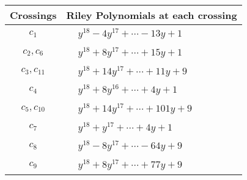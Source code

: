 \documentclass[1p]{elsarticle_modified}
\theoremstyle{definition}
\begin{document}
\begin{tabular}{m{50pt}|m{274pt}}
Crossings & \hspace{64pt}Riley Polynomials at each crossing \\
\hline $$\begin{aligned}c_{1}\end{aligned}$$&$\begin{aligned}
&y^{18}-4 y^{17}+\cdots-13 y+1
\end{aligned}$\\
\hline $$\begin{aligned}c_{2},c_{6}\end{aligned}$$&$\begin{aligned}
&y^{18}+8 y^{17}+\cdots+15 y+1
\end{aligned}$\\
\hline $$\begin{aligned}c_{3},c_{11}\end{aligned}$$&$\begin{aligned}
&y^{18}+14 y^{17}+\cdots+11 y+9
\end{aligned}$\\
\hline $$\begin{aligned}c_{4}\end{aligned}$$&$\begin{aligned}
&y^{18}+8 y^{16}+\cdots+4 y+1
\end{aligned}$\\
\hline $$\begin{aligned}c_{5},c_{10}\end{aligned}$$&$\begin{aligned}
&y^{18}+14 y^{17}+\cdots+101 y+9
\end{aligned}$\\
\hline $$\begin{aligned}c_{7}\end{aligned}$$&$\begin{aligned}
&y^{18}+y^{17}+\cdots+4 y+1
\end{aligned}$\\
\hline $$\begin{aligned}c_{8}\end{aligned}$$&$\begin{aligned}
&y^{18}-8 y^{17}+\cdots-64 y+9
\end{aligned}$\\
\hline $$\begin{aligned}c_{9}\end{aligned}$$&$\begin{aligned}
&y^{18}+8 y^{17}+\cdots+77 y+9
\end{aligned}$\\
\hline
\end{tabular}\\~\\
\end{document}
